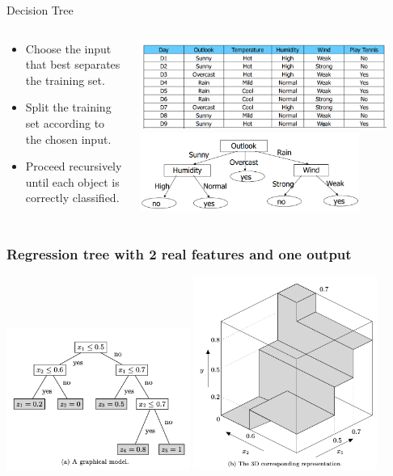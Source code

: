 \begin{frame}{Decision Tree}
  \begin{columns}
    \begin{column}{0.4\textwidth}  
  \begin{itemize}
    \item Choose the input that best separates the training set.
    \item Split the training set according to the chosen input.
    \item Proceed recursively until each object is correctly classified.
  \end{itemize}
\end{column}
\begin{column}{0.6\textwidth}
\includegraphics[width=0.9\textwidth]{images/DT1_1.png}\\
\includegraphics[width=0.8\textwidth]{images/DT1_2.png}
\end{column}
\end{columns}
\end{frame}

\begin{frame}
  \frametitle{Regression tree with 2 real features and one output}
  \includegraphics[width=0.45\textwidth]{images/RT_1.png}
  \includegraphics[width=0.45\textwidth]{images/RT_2.png}
\end{frame}

